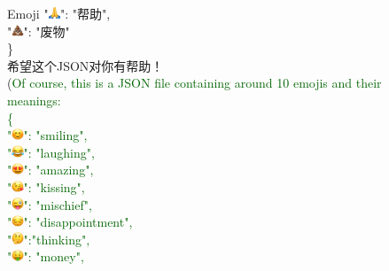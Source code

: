 \begin{figure}[]
{\begin{AIbox}{Emoji}
{{"\includegraphics[height=10pt]{Fig/folded-hands_1f64f.png}": "帮助",\\
"\includegraphics[height=10pt]{Fig/pile-of-poo_1f4a9.png}": "废物"\\
\} \\
希望这个JSON对你有帮助！} \\ (\textcolor{darkgreen}{Of course, this is a JSON file containing around 10 emojis and their meanings:\\
\{\\
"\includegraphics[height=10pt]{Fig/smiling-face-with-smiling-eyes_1f60a.png}": "smiling", \\
"\includegraphics[height=10pt]{Fig/face-with-tears-of-joy_1f602.png}": "laughing", \\
"\includegraphics[height=10pt]{Fig/smiling-face-with-heart-eyes_1f60d.png}": "amazing", \\
"\includegraphics[height=10pt]{Fig/face-blowing-a-kiss_1f618.png}": "kissing", \\
"\includegraphics[height=10pt]{Fig/winking-face-with-tongue_1f61c.png}": "mischief",\\
"\includegraphics[height=10pt]{Fig/pensive-face_1f614.png}": "disappointment", \\
"\includegraphics[height=10pt]{Fig/thinking-face_1f914.png}":"thinking", \\
"\includegraphics[height=10pt]{Fig/money-mouth-face_1f911.png}": "money",\\
}}
\end{AIbox}}
\end{figure}

